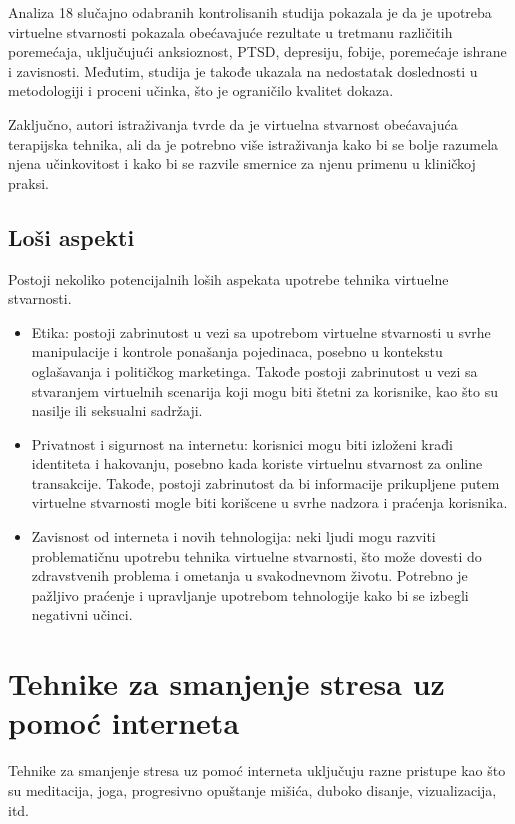 \documentclass[a4paper]{article}
\begin{document}
\begin{itemize}
Analiza 18 slučajno odabranih kontrolisanih studija pokazala je da je upotreba virtuelne stvarnosti pokazala obećavajuće rezultate u tretmanu različitih poremećaja, uključujući anksioznost, PTSD, depresiju, fobije, poremećaje ishrane i zavisnosti. Međutim, studija je takođe ukazala na nedostatak doslednosti u metodologiji i proceni učinka, što je ograničilo kvalitet dokaza.

Zaključno, autori istraživanja tvrde da je virtuelna stvarnost obećavajuća terapijska tehnika, ali da je potrebno više istraživanja kako bi se bolje razumela njena učinkovitost i kako bi se razvile smernice za njenu primenu u kliničkoj praksi.
\end{itemize}

\subsection{Loši aspekti}
Postoji nekoliko potencijalnih loših aspekata upotrebe tehnika virtuelne stvarnosti.

\begin{itemize} 

\item Etika: postoji zabrinutost u vezi sa upotrebom virtuelne stvarnosti u svrhe manipulacije i kontrole ponašanja pojedinaca, posebno u kontekstu oglašavanja i političkog marketinga. Takođe postoji zabrinutost u vezi sa stvaranjem virtuelnih scenarija koji mogu biti štetni za korisnike, kao što su nasilje ili seksualni sadržaji.

\item Privatnost i sigurnost na internetu: korisnici mogu biti izloženi krađi identiteta i hakovanju, posebno kada koriste virtuelnu stvarnost za online transakcije. Takođe, postoji zabrinutost da bi informacije prikupljene putem virtuelne stvarnosti mogle biti korišcene u svrhe nadzora i praćenja korisnika.

\item Zavisnost od interneta i novih tehnologija: neki ljudi mogu razviti problematičnu upotrebu tehnika virtuelne stvarnosti, što može dovesti do zdravstvenih problema i ometanja u svakodnevnom životu. Potrebno je pažljivo praćenje i upravljanje upotrebom tehnologije kako bi se izbegli negativni učinci.
\end{itemize}

\section{Tehnike za smanjenje stresa uz pomoć interneta}
\label{sec:tehnikeStresa}
Tehnike za smanjenje stresa uz pomoć interneta uključuju razne pristupe kao što su meditacija, joga, progresivno opuštanje mišića, duboko disanje, vizualizacija, itd.
\end{document}
